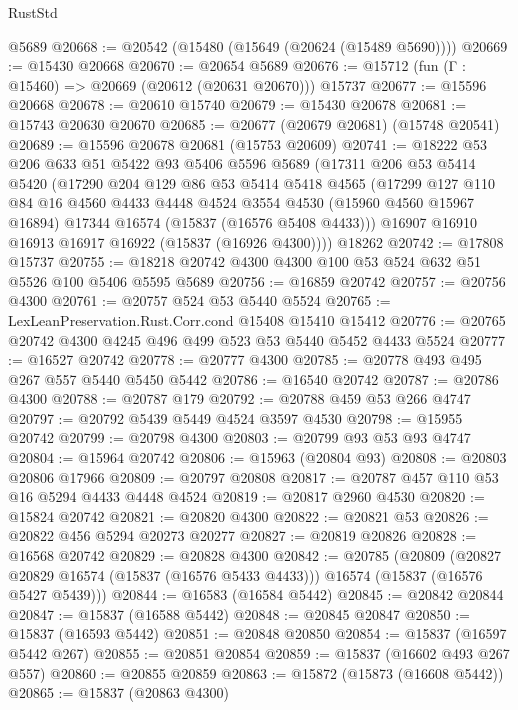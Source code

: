 \begin{lexlean}{RustStd}
\begin{coremodule}
{\begin{coremodule}
{{{{{{{{{{{{{{{{{{{{{{{{{{{{{{{{{{{{{{{{{{{{{{{{{{{{{{{{{{{{    @5689
@20668 := @20542 (@15480 (@15649 (@20624 (@15489 @5690))))
@20669 := @15430 @20668
@20670 := @20654 @5689
@20676 := @15712 (fun (Γ : @15460) => @20669 (@20612 (@20631 @20670))) @15737
@20677 := @15596 @20668
@20678 := @20610 @15740
@20679 := @15430 @20678
@20681 := @15743 @20630 @20670
@20685 := @20677 (@20679 @20681) (@15748 @20541)
@20689 := @15596 @20678 @20681 (@15753 @20609)
@20741 := @18222
    @53
    @206
    @633
    @51
    @5422
    @93
    @5406
    @5596
    @5689
    (@17311
      @206
      @53
      @5414
      @5420
      (@17290
        @204
        @129
        @86
        @53
        @5414
        @5418
        @4565
        (@17299
          @127
          @110
          @84
          @16
          @4560
          @4433
          @4448
          @4524
          @3554
          @4530
          (@15960 @4560 @15967 @16894)
          @17344
          @16574
          (@15837 (@16576 @5408 @4433)))
        @16907
        @16910
        @16913
        @16917
        @16922
        (@15837 (@16926 @4300))))
    @18262
@20742 := @17808 @15737
@20755 := @18218 @20742 @4300 @4300 @100 @53 @524 @632 @51 @5526 @100 @5406 @5595 @5689
@20756 := @16859 @20742
@20757 := @20756 @4300
@20761 := @20757 @524 @53 @5440 @5524
@20765 := LexLeanPreservation.Rust.Corr.cond @15408 @15410 @15412
@20776 := @20765 @20742 @4300 @4245 @496 @499 @523 @53 @5440 @5452 @4433 @5524
@20777 := @16527 @20742
@20778 := @20777 @4300
@20785 := @20778 @493 @495 @267 @557 @5440 @5450 @5442
@20786 := @16540 @20742
@20787 := @20786 @4300
@20788 := @20787 @179
@20792 := @20788 @459 @53 @266 @4747
@20797 := @20792 @5439 @5449 @4524 @3597 @4530
@20798 := @15955 @20742
@20799 := @20798 @4300
@20803 := @20799 @93 @53 @93 @4747
@20804 := @15964 @20742
@20806 := @15963 (@20804 @93)
@20808 := @20803 @20806 @17966
@20809 := @20797 @20808
@20817 := @20787 @457 @110 @53 @16 @5294 @4433 @4448 @4524
@20819 := @20817 @2960 @4530
@20820 := @15824 @20742
@20821 := @20820 @4300
@20822 := @20821 @53
@20826 := @20822 @456 @5294 @20273 @20277
@20827 := @20819 @20826
@20828 := @16568 @20742
@20829 := @20828 @4300
@20842 := @20785
    (@20809
      (@20827 @20829 @16574 (@15837 (@16576 @5433 @4433)))
      @16574
      (@15837 (@16576 @5427 @5439)))
@20844 := @16583 (@16584 @5442)
@20845 := @20842 @20844
@20847 := @15837 (@16588 @5442)
@20848 := @20845 @20847
@20850 := @15837 (@16593 @5442)
@20851 := @20848 @20850
@20854 := @15837 (@16597 @5442 @267)
@20855 := @20851 @20854
@20859 := @15837 (@16602 @493 @267 @557)
@20860 := @20855 @20859
@20863 := @15872 (@15873 (@16608 @5442))
@20865 := @15837 (@20863 @4300)
}}}}}}}}}}}}}}}}}}}}}}}}}}}}}}}}}}}}}}}}}}}}}}}}}}}}}}}}}}}}
\end{coremodule}}
\end{coremodule}
\end{lexlean}
